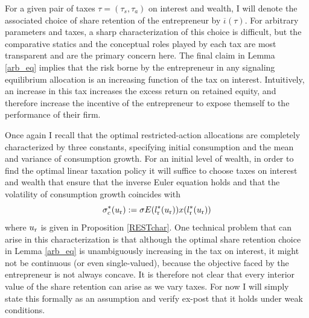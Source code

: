 \documentclass[11pt]{article}
\theoremstyle{plain}
\begin{document}

For a given pair of taxes $\tau = (\tau_s, \tau_a)$ on interest and wealth, I will denote the associated choice of share retention of the entrepreneur by $\overline{\iota}(\tau)$. For arbitrary parameters and taxes, a sharp characterization of this choice is difficult, but the comparative statics and the conceptual roles played by each tax are most transparent and are the primary concern here. The final claim in Lemma \ref{arb_eq} implies that the risk borne by the entrepreneur in any signaling equilibrium allocation is an increasing function of the tax on interest. Intuitively, an increase in this tax increases the excess return on retained equity, and therefore increase the incentive of the entrepreneur to expose themself to the performance of their firm. 

Once again I recall that the optimal restricted-action allocations are completely characterized by three constants, specifying initial consumption and the mean and variance of consumption growth. For an initial level of wealth, in order to find the optimal linear taxation policy it will suffice to choose taxes on interest and wealth that ensure that the inverse Euler equation holds and that the volatility of consumption growth coincides with 
\begin{equation}
\sigma_c^*(u_{\textnormal{r}}) := \sigma E(l_{\textnormal{r}}^*(u_{\textnormal{r}}))x(l_{\textnormal{r}}^*(u_{\textnormal{r}}))
\label{sig_c}
\end{equation}
where $u_{\textnormal{r}}$ is given in Proposition \ref{RESTchar}. One technical problem that can arise in this characterization is that although the optimal share retention choice in Lemma \ref{arb_eq} is unambiguously increasing in the tax on interest, it might not be continuous (or even single-valued), because the objective faced by the entrepreneur is not always concave. It is therefore not clear that every interior value of the share retention can arise as we vary taxes. For now I will simply state this formally as an assumption and verify ex-post that it holds under weak conditions.
\end{document}
